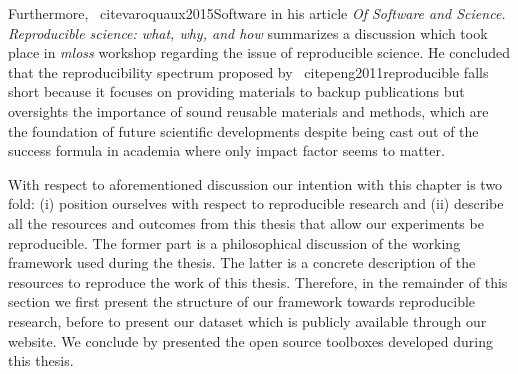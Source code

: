 Furthermore, \citeauthor{varoquaux2015Software}~cite{varoquaux2015Software} in his article %
\emph{Of Software and Science. Reproducible science: what, why, and how} summarizes a discussion which took place in \emph{\acs{mloss}} workshop regarding the issue of reproducible science.
He concluded that the reproducibility spectrum proposed by \citeauthor{peng2011reproducible}~cite{peng2011reproducible} falls short because it focuses on providing materials to backup publications but oversights the importance of sound reusable materials and methods, which are the foundation of future scientific developments despite being cast out of the success formula in academia where only impact factor seems to matter.

With respect to aforementioned discussion our intention with this chapter is two fold: (i) position ourselves with respect to reproducible research and (ii) describe all the resources and outcomes from this thesis that allow our experiments be reproducible.
The former part is a philosophical discussion of the working framework used during the thesis. 
The latter is a concrete description of the resources to reproduce the work of this thesis.
Therefore, in the remainder of this section we first present the structure of our framework towards reproducible research, before to present our dataset which is publicly available through our website.
We conclude by presented the open source toolboxes developed during this thesis.

